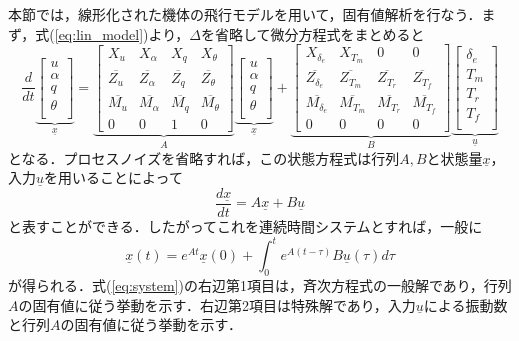 本節では，線形化された機体の飛行モデルを用いて，固有値解析を行なう．まず，式(\ref{eq:lin_model})より，$\Delta$を省略して微分方程式をまとめると
\begin{equation}
  \dfrac{d}{dt}
  \underbrace{
  \left[
  \begin{array}{cccc}
    u \\
    \alpha \\
    q \\
    \theta \\
  \end{array}
  \right]}_{\underline{x}} =
  \underbrace{
  \left[
  \begin{array}{cccc}
    X_u & X_\alpha & X_q & X_\theta \\
    \overline{Z_u} & \overline{Z_\alpha} & \overline{Z_q} & \overline{Z_\theta} \\
    \overline{M_u} & \overline{M_\alpha} & \overline{M_q} & \overline{M_\theta} \\
    0 & 0 & 1 & 0
  \end{array}
  \right]}_{A}
  \underbrace{
  \left[
  \begin{array}{cccc}
    u \\
    \alpha \\
    q \\
    \theta \\
  \end{array}
  \right]}_{\underline{x}} +
  \underbrace{
  \left[
  \begin{array}{cccc}
    X_{\delta_e} & X_{T_m} & 0 & 0 \\
    \overline{Z_{\delta_e}} & \overline{Z_{T_m}} & \overline{Z_{T_r}} & \overline{Z_{T_f}} \\
    \overline{M_{\delta_e}} & \overline{M_{T_m}} & \overline{M_{T_r}} & \overline{M_{T_f}} \\
    0 & 0 & 0 & 0
  \end{array}
  \right]}_{B}
  \underbrace{
  \left[
  \begin{array}{cccc}
    \delta_e \\
    T_m \\
    T_r \\
    T_f \\
  \end{array}
  \right]}_{\underline{u}}
\end{equation}
となる．プロセスノイズを省略すれば，この状態方程式は行列$A,B$と状態量$\underline{x}$，入力$\underline{u}$を用いることによって
\begin{equation}
  \dfrac{d\underline{x}}{dt} = A\underline{x} + B\underline{u}
\label{eq:matrix_A}
\end{equation}
と表すことができる．したがってこれを連続時間システムとすれば，一般に
\begin{equation}
  \underline{x}(t) = e^{At}\underline{x}(0) + \int_0^t e^{A(t-\tau)}B\underline{u}(\tau) d\tau
  \label{eq:system}
\end{equation}
が得られる．式(\ref{eq:system})の右辺第1項目は，斉次方程式の一般解であり，行列$A$の固有値に従う挙動を示す．右辺第2項目は特殊解であり，入力$\underline{u}$による振動数と行列$A$の固有値に従う挙動を示す．

